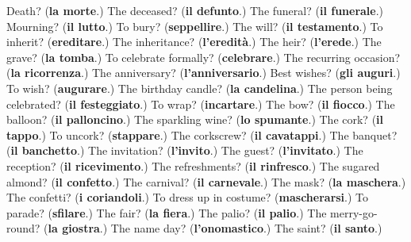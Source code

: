 \begin{tcolorbox}[breakable,colback=teal!4,colframe=teal!35!black,title={Before you move on}]
Death? (\textbf{la morte}.) The deceased? (\textbf{il defunto}.) The funeral? (\textbf{il funerale}.) Mourning? (\textbf{il lutto}.) To bury? (\textbf{seppellire}.) The will? (\textbf{il testamento}.) To inherit? (\textbf{ereditare}.) The inheritance? (\textbf{l'eredità}.) The heir? (\textbf{l'erede}.) The grave? (\textbf{la tomba}.) To celebrate formally? (\textbf{celebrare}.) The recurring occasion? (\textbf{la ricorrenza}.) The anniversary? (\textbf{l'anniversario}.) Best wishes? (\textbf{gli auguri}.) To wish? (\textbf{augurare}.) The birthday candle? (\textbf{la candelina}.) The person being celebrated? (\textbf{il festeggiato}.) To wrap? (\textbf{incartare}.) The bow? (\textbf{il fiocco}.) The balloon? (\textbf{il palloncino}.) The sparkling wine? (\textbf{lo spumante}.) The cork? (\textbf{il tappo}.) To uncork? (\textbf{stappare}.) The corkscrew? (\textbf{il cavatappi}.) The banquet? (\textbf{il banchetto}.) The invitation? (\textbf{l'invito}.) The guest? (\textbf{l'invitato}.) The reception? (\textbf{il ricevimento}.) The refreshments? (\textbf{il rinfresco}.) The sugared almond? (\textbf{il confetto}.) The carnival? (\textbf{il carnevale}.) The mask? (\textbf{la maschera}.) The confetti? (\textbf{i coriandoli}.) To dress up in costume? (\textbf{mascherarsi}.) To parade? (\textbf{sfilare}.) The fair? (\textbf{la fiera}.) The palio? (\textbf{il palio}.) The merry-go-round? (\textbf{la giostra}.) The name day? (\textbf{l'onomastico}.) The saint? (\textbf{il santo}.)
\end{tcolorbox}
